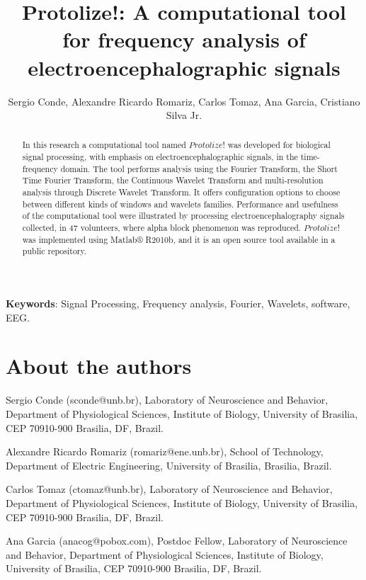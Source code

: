 \documentclass[12pt, a4paper]{article}
\begin{document}
\title{Protolize!: A computational tool for frequency analysis of electroencephalographic signals}
\author{Sergio Conde, Alexandre Ricardo Romariz, Carlos Tomaz, Ana Garcia, Cristiano Silva Jr.}
\date{}
\maketitle

\begin{abstract}

In this research a computational tool named $Protolize!$ was developed for biological signal processing, with emphasis on electroencephalographic signals, in the time-frequency domain. The tool performs analysis using the Fourier Transform, the Short Time Fourier Transform, the Continuous Wavelet Transform and multi-resolution analysis through Discrete Wavelet Transform. It offers configuration options to choose between different kinds of windows and wavelets families. Performance and usefulness of the computational tool were illustrated by processing electroencephalography signals collected, in 47 volunteers, where alpha block phenomenon was reproduced. $Protolize!$ was implemented using Matlab® R2010b, and it is an open source tool available in a public repository.

\end{abstract}

\textbf{Keywords}: Signal Processing, Frequency analysis, Fourier, Wavelets, software, EEG.

\section{About the authors}

Sergio Conde (sconde@unb.br), Laboratory of Neuroscience and Behavior, Department of Physiological Sciences, Institute of Biology, University of Brasilia, CEP 70910-900 Brasilia, DF,  Brazil.

Alexandre Ricardo Romariz (romariz@ene.unb.br), School of Technology, Department of Electric Engineering, University of Brasilia, Brasilia, Brazil.

Carlos Tomaz (ctomaz@unb.br), Laboratory of Neuroscience and Behavior, Department of Physiological Sciences, Institute of Biology, University of Brasilia, CEP 70910-900 Brasilia, DF,  Brazil.

Ana Garcia (anacog@pobox.com), Postdoc Fellow, Laboratory of Neuroscience and Behavior, Department of Physiological Sciences, Institute of Biology, University of Brasilia, CEP 70910-900 Brasilia, DF,  Brazil.
\end{document}
